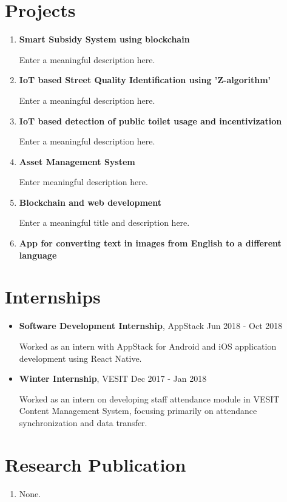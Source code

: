 \documentclass[margin]{res}
\begin{document}
\begin{resume}
\section{Projects}
\begin{enumerate}
  \item {\bf Smart Subsidy System using blockchain}
  
  Enter a meaningful description here. 
  \item {\bf IoT based Street Quality Identification using 'Z-algorithm' }
  
  Enter a meaningful description here. 
  \item {\bf IoT based detection of public toilet usage and incentivization}
  
  Enter a meaningful description here. 
  \item {\bf Asset Management System}
  
  Enter meaningful description here.
  \item {\bf Blockchain and web development}
  
  Enter a meaningful title and description here.
  \item {\bf App for converting text in images from English to a different language}
\end{enumerate}

  \section{Internships}
  \begin{itemize}
    \item {\bf Software Development Internship},  AppStack \hfill Jun 2018 - Oct 2018
    
    Worked as an intern with AppStack for Android and iOS application development using React Native. 
    \item {\bf Winter Internship}, VESIT \hfill Dec 2017 - Jan 2018
    
    Worked as an intern on developing staff attendance module in VESIT Content Management System, focusing primarily on 
    attendance synchronization and data transfer.
    
 \end{itemize}
 
\section{Research Publication}
\begin{enumerate}
  \item None. 
\end{enumerate}


\end{resume}
\end{document}
